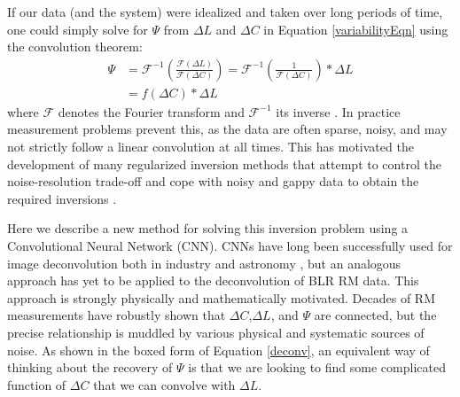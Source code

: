 \documentclass[floatfix,twocolumn,trackchanges,linenumbers]{aastex7}
\begin{document}
If our data (and the system) were idealized and taken over long periods of time, one could simply solve for $\Psi$ from $\Delta L$ and $\Delta C$ in Equation \ref{variabilityEqn} using the convolution theorem:
\begin{align}\label{deconv}
\Psi &= \mathcal{F}^{-1}\left(\frac{\mathcal{F}(\Delta L)}{\mathcal{F}(\Delta C)}\right) = \mathcal{F}^{-1}\left(\frac{1}{\mathcal{F}(\Delta C)}\right)*\Delta L \\
&= \boxed{f(\Delta C)*\Delta L}
\end{align}
where $\mathcal{F}$ denotes the Fourier transform and $\mathcal{F}^{-1}$ its inverse \citep{BlandfordMckee1982_RM_Fourier}. In practice measurement problems prevent this, as the data are often sparse, noisy, and may not strictly follow a linear convolution at all times. This has motivated the development of many regularized inversion methods that attempt to control the noise-resolution trade-off and cope with noisy and gappy data to obtain the required inversions \citep{MEMEcho1,MEMEcho2,Krolik1995_regularizedLinearInversion}.

Here we describe a new method for solving this inversion problem using a Convolutional Neural Network (CNN). CNNs have long been successfully used for image deconvolution both in industry \citep{industry1_Li2021,industry2_DLGEO,MicrosoftLenovoDeconv} and astronomy \citep{Herbel_2018_ASTRO_PSFDL,Akhaury22_DL_GALDECONV}, but an analogous approach has yet to be applied to the deconvolution of BLR RM data. This approach is strongly physically and mathematically motivated. Decades of RM measurements have robustly shown that $\Delta C$,$\Delta L$, and $\Psi$ are connected, but the precise relationship is muddled by various physical and systematic sources of noise. As shown in the boxed form of Equation \ref{deconv}, an equivalent way of thinking about the recovery of $\Psi$ is that we are looking to find some complicated function of $\Delta C$ that we can convolve with $\Delta L$. 
\end{document}
